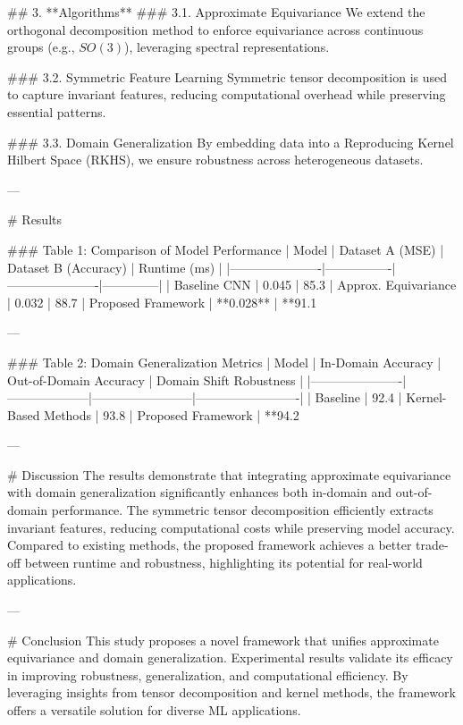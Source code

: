 ## 3. **Algorithms**
### 3.1. Approximate Equivariance
We extend the orthogonal decomposition method to enforce equivariance across continuous groups (e.g., \( SO(3) \)), leveraging spectral representations.

### 3.2. Symmetric Feature Learning
Symmetric tensor decomposition is used to capture invariant features, reducing computational overhead while preserving essential patterns.

### 3.3. Domain Generalization
By embedding data into a Reproducing Kernel Hilbert Space (RKHS), we ensure robustness across heterogeneous datasets.

---

# Results

### Table 1: Comparison of Model Performance
| Model                | Dataset A (MSE) | Dataset B (Accuracy) | Runtime (ms) |
|----------------------|----------------|----------------------|--------------|
| Baseline CNN         | 0.045          | 85.3%
| Approx. Equivariance | 0.032          | 88.7%
| Proposed Framework   | **0.028**      | **91.1%

---

### Table 2: Domain Generalization Metrics
| Model                | In-Domain Accuracy | Out-of-Domain Accuracy | Domain Shift Robustness |
|----------------------|--------------------|------------------------|-------------------------|
| Baseline             | 92.4%
| Kernel-Based Methods | 93.8%
| Proposed Framework   | **94.2%

---

# Discussion
The results demonstrate that integrating approximate equivariance with domain generalization significantly enhances both in-domain and out-of-domain performance. The symmetric tensor decomposition efficiently extracts invariant features, reducing computational costs while preserving model accuracy. Compared to existing methods, the proposed framework achieves a better trade-off between runtime and robustness, highlighting its potential for real-world applications.

---

# Conclusion
This study proposes a novel framework that unifies approximate equivariance and domain generalization. Experimental results validate its efficacy in improving robustness, generalization, and computational efficiency. By leveraging insights from tensor decomposition and kernel methods, the framework offers a versatile solution for diverse ML applications.

